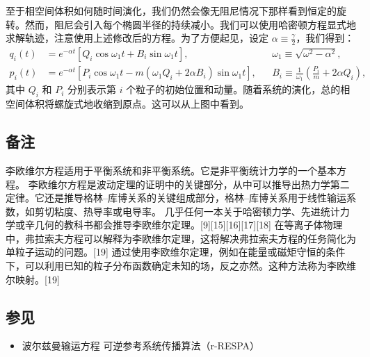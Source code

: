 至于相空间体积如何随时间演化，我们仍然会像无阻尼情况下那样看到恒定的旋转。然而，阻尼会引入每个椭圆半径的持续减小。我们可以使用哈密顿方程显式地求解轨迹，注意使用上述修改后的方程。为了方便起见，设定 \( \alpha \equiv \frac{\gamma}{2} \)，我们得到：
\[
\begin{aligned}
q_i(t) &= e^{-\alpha t} \left[ Q_i \cos \omega_1 t + B_i \sin \omega_1 t \right], && \omega_1 \equiv \sqrt{\omega^2 - \alpha^2}, \\
p_i(t) &= e^{-\alpha t} \left[ P_i \cos \omega_1 t - m(\omega_1 Q_i + 2 \alpha B_i) \sin \omega_1 t \right], && B_i \equiv \frac{1}{\omega_1} \left( \frac{P_i}{m} + 2 \alpha Q_i \right),
\end{aligned}~
\]
其中 \( Q_i \) 和 \( P_i \) 分别表示第 \( i \) 个粒子的初始位置和动量。随着系统的演化，总的相空间体积将螺旋式地收缩到原点。这可以从上图中看到。
\subsection{备注}  
李欧维尔方程适用于平衡系统和非平衡系统。它是非平衡统计力学的一个基本方程。  
李欧维尔方程是波动定理的证明中的关键部分，从中可以推导出热力学第二定律。它还是推导格林–库博关系的关键组成部分，格林–库博关系用于线性输运系数，如剪切粘度、热导率或电导率。  
几乎任何一本关于哈密顿力学、先进统计力学或辛几何的教科书都会推导李欧维尔定理。[9][15][16][17][18]  
在等离子体物理中，弗拉索夫方程可以解释为李欧维尔定理，这将解决弗拉索夫方程的任务简化为单粒子运动的问题。[19] 通过使用李欧维尔定理，例如在能量或磁矩守恒的条件下，可以利用已知的粒子分布函数确定未知的场，反之亦然。这种方法称为李欧维尔映射。[19]
\subsection{参见}  
\begin{itemize}
\item 波尔兹曼输运方程  
可逆参考系统传播算法（r-RESPA）
\end{itemize}